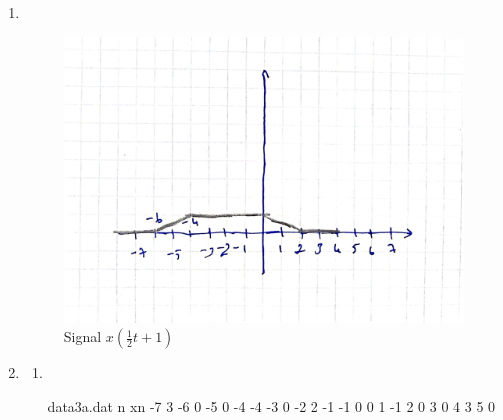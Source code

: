 \documentclass[10pt,a4paper, margin=1in]{article}
\begin{document}
\begin{enumerate}
    \item ~\\
          \begin{figure}[H]
              \centering
              \includegraphics[scale=0.1]{hw1_q2.jpeg}
              \caption{Signal $x(\frac{1}{2}t+1)$}
          \end{figure}

    \item %
          \begin{enumerate}
              \item %
                ~\\
              \begin{filecontents}{data3a.dat}
                 n   xn
                 -7   3
                 -6   0
                 -5   0
                 -4   -4
                 -3   0
                 -2   2
                 -1   -1
                 0    0
                 1    -1
                 2    0
                 3    0 
                 4    3  
                 5    0  
                \end{filecontents}


\end{enumerate}
\end{enumerate}
\end{document}
